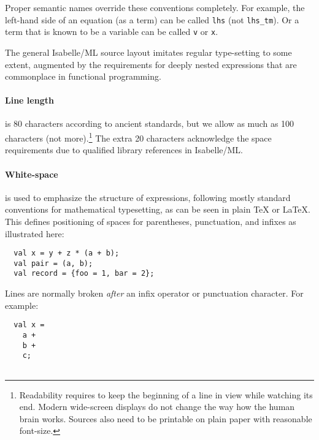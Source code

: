 \begin{isabellebody}
\begin{isamarkuptext}
\begin{itemize}
\begin{itemize}
  \end{itemize}

  Proper semantic names override these conventions completely.  For
  example, the left-hand side of an equation (as a term) can be called
  \verb|lhs| (not \verb|lhs_tm|).  Or a term that is known
  to be a variable can be called \verb|v| or \verb|x|.

  \end{itemize}%
\end{isamarkuptext}%
\isamarkuptrue%
%
\isamarkuptrue%
%
\begin{isamarkuptext}%
The general Isabelle/ML source layout imitates regular
  type-setting to some extent, augmented by the requirements for
  deeply nested expressions that are commonplace in functional
  programming.

  \paragraph{Line length} is 80 characters according to ancient
  standards, but we allow as much as 100 characters (not
  more).\footnote{Readability requires to keep the beginning of a line
  in view while watching its end.  Modern wide-screen displays do not
  change the way how the human brain works.  Sources also need to be
  printable on plain paper with reasonable font-size.} The extra 20
  characters acknowledge the space requirements due to qualified
  library references in Isabelle/ML.

  \paragraph{White-space} is used to emphasize the structure of
  expressions, following mostly standard conventions for mathematical
  typesetting, as can be seen in plain {\TeX} or {\LaTeX}.  This
  defines positioning of spaces for parentheses, punctuation, and
  infixes as illustrated here:

  \begin{verbatim}
  val x = y + z * (a + b);
  val pair = (a, b);
  val record = {foo = 1, bar = 2};
  \end{verbatim}

  Lines are normally broken \emph{after} an infix operator or
  punctuation character.  For example:

  \begin{verbatim}
  val x =
    a +
    b +
    c;


\end{verbatim}
\end{isamarkuptext}
\end{isabellebody}
